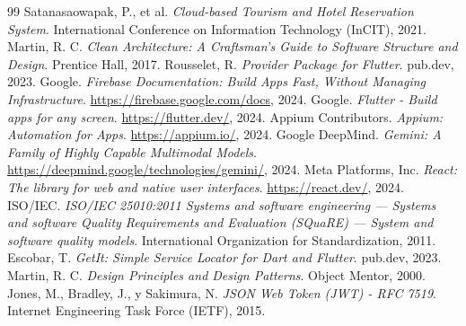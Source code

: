 \documentclass[12pt,letterpaper]{report}
\begin{document}
\begin{thebibliography}{99}
Satanasaowapak, P., et al. \textit{Cloud-based Tourism and Hotel Reservation System}. International Conference on Information Technology (InCIT), 2021.
Martin, R. C. \textit{Clean Architecture: A Craftsman's Guide to Software Structure and Design}. Prentice Hall, 2017.
Rousselet, R. \textit{Provider Package for Flutter}. pub.dev, 2023.
Google. \textit{Firebase Documentation: Build Apps Fast, Without Managing Infrastructure}. \url{https://firebase.google.com/docs}, 2024.
Google. \textit{Flutter - Build apps for any screen}. \url{https://flutter.dev/}, 2024.
Appium Contributors. \textit{Appium: Automation for Apps}. \url{https://appium.io/}, 2024.
Google DeepMind. \textit{Gemini: A Family of Highly Capable Multimodal Models}. \url{https://deepmind.google/technologies/gemini/}, 2024.
Meta Platforms, Inc. \textit{React: The library for web and native user interfaces}. \url{https://react.dev/}, 2024.
ISO/IEC. \textit{ISO/IEC 25010:2011 Systems and software engineering — Systems and software Quality Requirements and Evaluation (SQuaRE) — System and software quality models}. International Organization for Standardization, 2011.
Escobar, T. \textit{GetIt: Simple Service Locator for Dart and Flutter}. pub.dev, 2023.
Martin, R. C. \textit{Design Principles and Design Patterns}. Object Mentor, 2000.
Jones, M., Bradley, J., y Sakimura, N. \textit{JSON Web Token (JWT) - RFC 7519}. Internet Engineering Task Force (IETF), 2015.
\end{thebibliography}
\end{document}
